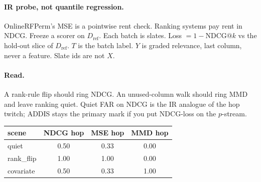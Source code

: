 \documentclass[11pt]{article}
\begin{document}
\paragraph{IR probe, not quantile regression.}
OnlineRFPerm's MSE is a pointwise rent check. Ranking systems pay rent in NDCG.
Freeze a scorer on $D_{\mathrm{ref}}$. Each batch is slates. Loss $=1-\mathrm{NDCG}@k$
vs the hold-out slice of $D_{\mathrm{ref}}$. $T$ is the batch label. $Y$ is graded
relevance, last column, never a feature. Slate ids are not $X$.
\paragraph{Read.}
A rank-rule flip should ring NDCG. An unused-column walk should ring MMD and
leave ranking quiet. Quiet FAR on NDCG is the IR analogue of the hop twitch;
ADDIS stays the primary mark if you put NDCG-loss on the $p$-stream.
\vspace{0.8em}
\begin{tabular}{@{}lccc@{}}
\toprule
scene & NDCG hop & MSE hop & MMD hop \\
\midrule
quiet & 0.50 & 0.33 & 0.00 \\
rank_flip & 1.00 & 1.00 & 0.00 \\
covariate & 0.50 & 0.33 & 1.00 \\
\bottomrule
\end{tabular}
\end{document}
